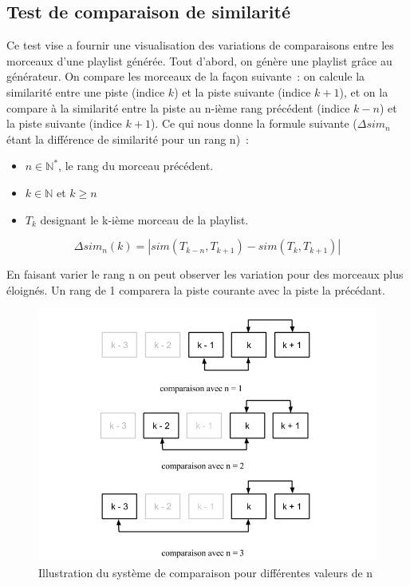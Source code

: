 \subsection{Test de comparaison de similarité}
\label{tests:qualite:comparaison}

Ce test vise a fournir une visualisation des variations de comparaisons entre
les morceaux d'une playlist générée. Tout d'abord, on génère une playlist grâce
au générateur. On compare les morceaux de la façon suivante~: on calcule la
similarité entre une piste (indice $k$) et la piste suivante (indice $k+1$),
et on la compare à la similarité entre la piste au n-ième rang précédent
(indice $k-n$) et la piste suivante (indice $k+1$). Ce qui nous donne la
formule suivante ($\Delta{}sim_{n}$ étant la différence de similarité pour un
rang n)~:

\begin{itemize}
  \item $n \in \mathbb{N}^{*}$, le rang du morceau précédent.
  \item $k \in \mathbb{N}$ et $k \geq n$
  \item $T_{k}$ designant le k-ième morceau de la playlist.
\end{itemize}

\begin{equation*}
  \Delta{}sim_{n}(k) = |sim(T_{k-n}, T_{k+1}) - sim(T_{k}, T_{k+1})|
\end{equation*}

En faisant varier le rang n on peut observer les variation pour des morceaux
plus éloignés. Un rang de 1 comparera la piste courante avec la piste la
précédant.

\begin{figure}[H]
\includegraphics[width=\textwidth]{data/tests/test-comparaison.png}
\caption{Illustration du système de comparaison pour différentes valeurs de n}
\end{figure}


